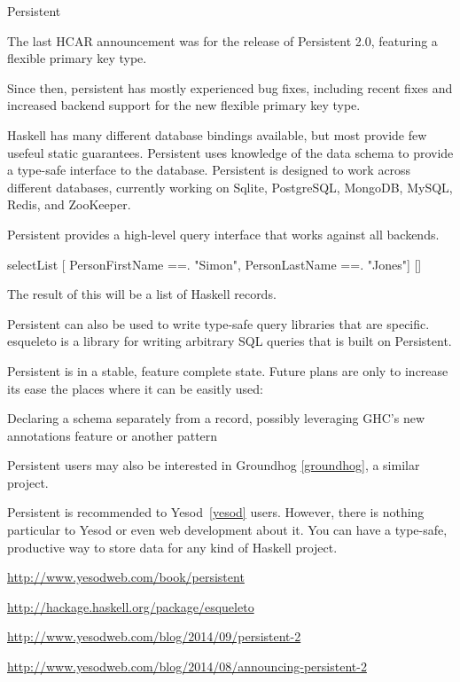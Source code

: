 \begin{hcarentry}{Persistent}
\label{persistent}
\makeheader

The last HCAR announcement was for the release of Persistent 2.0, featuring a flexible primary key type.

Since then, persistent has mostly experienced bug fixes, including recent fixes and increased backend support for the new flexible primary key type.

Haskell has many different database bindings available, but most provide few
usefeul static guarantees.  Persistent uses knowledge of the data schema to
provide a type-safe interface to the database.  Persistent is designed to work
across different databases, currently working on Sqlite, PostgreSQL, MongoDB,
MySQL, Redis, and ZooKeeper.

Persistent provides a high-level query interface that works against all
backends.

\begin{code}
selectList [ PersonFirstName ==. "Simon",
             PersonLastName ==. "Jones"] []
\end{code}

The result of this will be a list of Haskell records.

Persistent can also be used to write type-safe query libraries that are
specific.  esqueleto is a library for writing arbitrary SQL queries that is
built on Persistent.

\FuturePlans
Persistent is in a stable, feature complete state. Future plans are only to increase its ease the places where it can be easitly used:

\begin{compactitem}
\item Declaring a schema separately from a record, possibly leveraging GHC's
  new annotations feature or another pattern
\end{compactitem}

Persistent users may also be interested in Groundhog \cref{groundhog}, a
similar project.

Persistent is recommended to Yesod~\cref{yesod} users.  However, there is
nothing particular to Yesod or even web development about it.  You can have a
type-safe, productive way to store data for any kind of Haskell project.

\FurtherReading
\begin{compactitem}
\item \url{http://www.yesodweb.com/book/persistent} 
\item \url{http://hackage.haskell.org/package/esqueleto}
\item \url{http://www.yesodweb.com/blog/2014/09/persistent-2}
\item \url{http://www.yesodweb.com/blog/2014/08/announcing-persistent-2}
\end{compactitem}
\end{hcarentry}
